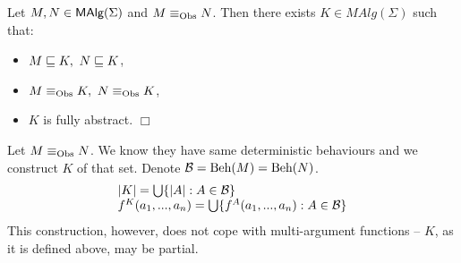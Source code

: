 \begin{Theorem}
Let $M,N \in \mbox{\rm\sf MAlg}(\Sigma)$ and $M \equiv_{\rm Obs} N$. Then there exists $K \in
MAlg(\Sigma)$ such that:
\begin{itemize}
\item $M \sqsubseteq K,\ N \sqsubseteq K$,
\item $M \equiv_{\rm Obs} K,\ N \equiv_{\rm Obs} K$,
\item $K$ is fully abstract. \hfill$\Box$
\end{itemize}
\end{Theorem}

\begin{Proof}
Let $M \equiv_{\rm Obs} N$. We know they have same deterministic behaviours and we
construct $K$ of that set. Denote ${\cal B} = \mbox{Beh}(M) = \mbox{Beh}(N)$.
\[
\begin{array}{l}
      |K| = \bigcup \{|A| : A \in {\cal B}\} \\
      f^K(a_1,...,a_n) = \bigcup \{f^A(a_1,...,a_n) : A \in {\cal B}\}
\end{array}
\]
This construction, however, does not cope with multi-argument
functions -- $K$, as it is defined above, may be partial. 
\end{Proof}





